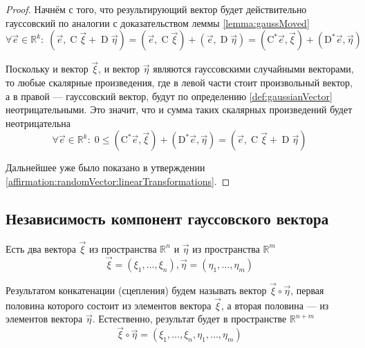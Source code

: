 \begin{proof}
  Начнём с того, что результирующий вектор будет действительно гауссовский по
  аналогии с доказательством леммы \ref{lemma:gaussMoved}
  $$\forall \vec{e} \in \mathbb{R}^k:\;
      \left( \vec{e}, \operatorname{C} \vec{\xi} + \operatorname{D} \vec{\eta}
          \right)
      = \left( \vec{e}, \operatorname{C} \vec{\xi} \right)
          + \left( \vec{e}, \operatorname{D} \vec{\eta} \right)
      = \left( \operatorname{C^*} \vec{e}, \vec{\xi} \right)
          + \left( \operatorname{D^*} \vec{e}, \vec{\eta} \right)$$

  Поскольку и вектор $\vec{\xi}$, и вектор $\vec{\eta}$ являются гауссовскими
  случайными векторами, то любые скалярные произведения, где в левой части
  стоит произвольный вектор, а в правой --- гауссовский вектор, будут по
  определению \ref{def:gaussianVector} неотрицательными. Это значит, что и
  сумма таких скалярных произведений будет неотрицательна
  $$\forall \vec{e} \in \mathbb{R}^k:\;
      0 \le \left( \operatorname{C^*} \vec{e}, \vec{\xi} \right)
          + \left( \operatorname{D^*} \vec{e}, \vec{\eta} \right)
      = \left( \vec{e}, \operatorname{C} \vec{\xi}
          + \operatorname{D} \vec{\eta} \right)$$

  Дальнейшее уже было показано в утверждении
  \ref{affirmation:randomVector:linearTransformations}.
\end{proof}

\subsection{Независимость компонент гауссовского вектора}

\begin{definition}
  Есть два вектора $\vec{\xi}$ из пространства $\mathbb{R}^n$ и $\vec{\eta}$
  из пространства $\mathbb{R}^m$
  $$\vec{\xi} = \left( \xi_1, \dots, \xi_n \right),
      \vec{\eta} = \left( \eta_1, \dots, \eta_m \right)$$

  Результатом конкатенации (сцепления) будем называть вектор
  $\vec{\xi} \circ \vec{\eta}$, первая половина которого состоит из
  элементов вектора $\vec{\xi}$, а вторая половина --- из элементов вектора
  $\vec{\eta}$. Естественно, результат будет в пространстве $\mathbb{R}^{n+m}$
  $$\vec{\xi} \circ \vec{\eta}
      = \left( \xi_1, \dots, \xi_n, \eta_1, \dots, \eta_m \right)$$
\end{definition}

